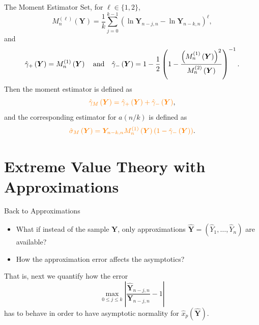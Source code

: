\documentclass{beamer}
\begin{document}
\begin{frame}{The Moment Estimator \parencite{dekkers1989}}
  Set, for  $\ell\in\{1, 2\}$,
  \begin{equation*}
    M_n^{(\ell)}\left(\bm Y\right) = \frac{1}{k}\sum_{j=0}^{k-1}
    \left(\ln \bm Y_{n-j, n} - \ln \bm Y_{n-k, n}\right)^\ell,
  \end{equation*}
  and
  \begin{equation*}
    \hat\gamma_+\left(\bm Y\right) = M_n^{(1)}\left(\bm Y\right)
    \quad\textnormal{and}\quad
    \hat\gamma_-\left(\bm Y\right) = 1
    - \frac{1}{2}\left(1 - \frac{\left(M_n^{(1)}\left(\bm Y\right)\right)^2}
    {M_n^{(2)}\left(\bm Y\right)}\right)^{-1}.
  \end{equation*}
  Then the moment estimator is defined as
  \begin{equation*}
    \textcolor{orange}{\hat\gamma_M\left(\bm Y\right)
    = \hat\gamma_+\left(\bm Y\right)
    + \hat\gamma_-\left(\bm Y\right)},
  \end{equation*}
  and the corresponding estimator for $a\left(n/k\right)$ is defined as
  \begin{equation*}
    \textcolor{orange}{
    \hat\sigma_M\left(\bm Y\right) = \bm Y_{n-k, n} M_n^{(1)}
    \left(\bm Y\right)\left(1 - \hat\gamma_-
    \left(\bm Y\right)\right)}.
  \end{equation*}
\end{frame}


\section{Extreme Value Theory with Approximations}


\begin{frame}{Back to Approximations}
  \begin{itemize}
    \item What if instead of the sample $\bm Y$, only approximations $\hat{\bm Y}
    = (\hat Y_1, \ldots, \hat Y_n)$ are available?
    \pause
    \item How the approximation error affects the asymptotics?
  \end{itemize}
  \vspace*{0.5cm}
  \pause

  That is, next we quantify how the error
  \begin{equation*}
    \max_{0\leq j\leq k} \left|\frac{\hat{\bm Y}_{n-j,n}}{\bm Y_{n-j,n}}
    - 1\right|
  \end{equation*}
  has to behave in order to have asymptotic normality for $\hat x_p(\hat{\bm
	Y})$.
\end{frame}
\end{document}
